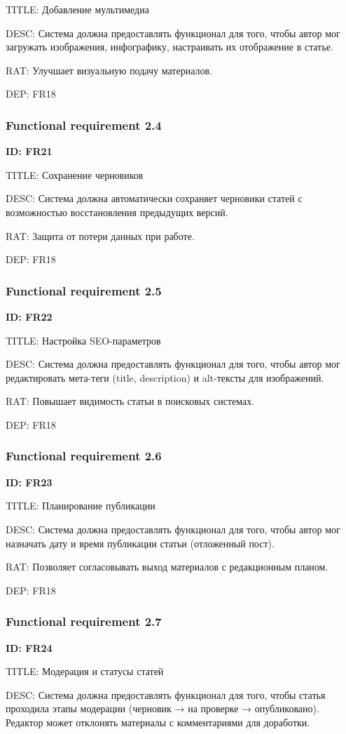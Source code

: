 \documentclass{scrreprt}
\begin{document}
TITLE: Добавление мультимедиа

DESC: Система должна предоставлять функционал для того, чтобы автор мог загружать изображения, инфографику, настраивать их отображение в статье.

RAT: Улучшает визуальную подачу материалов.

DEP: FR18
\subsubsection{Functional requirement 2.4}
\textbf{ID: FR21}

TITLE: Сохранение черновиков

DESC: Система должна автоматически сохраняет черновики статей с возможностью восстановления предыдущих версий.

RAT: Защита от потери данных при работе.

DEP: FR18
\subsubsection{Functional requirement 2.5}
\textbf{ID: FR22}

TITLE: Настройка SEO-параметров

DESC: Система должна предоставлять функционал для того, чтобы автор мог редактировать мета-теги (title, description) и alt-тексты для изображений.

RAT: Повышает видимость статьи в поисковых системах.

DEP: FR18
\subsubsection{Functional requirement 2.6}
\textbf{ID: FR23}

TITLE: Планирование публикации

DESC: Система должна предоставлять функционал для того, чтобы автор мог назначать дату и время публикации статьи (отложенный пост).

RAT: Позволяет согласовывать выход материалов с редакционным планом.

DEP: FR18
\subsubsection{Functional requirement 2.7}
\textbf{ID: FR24}

TITLE: Модерация и статусы статей

DESC: Система должна предоставлять функционал для того, чтобы статья проходила этапы модерации (черновик → на проверке → опубликовано). Редактор может отклонять материалы с комментариями для доработки.
\end{document}
